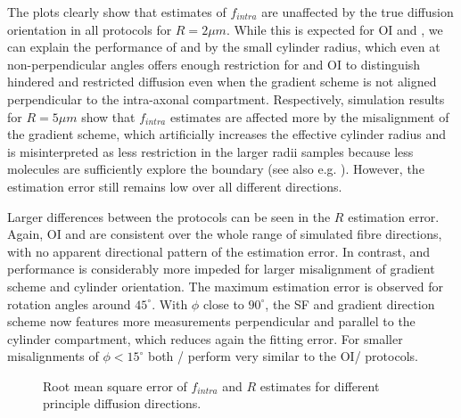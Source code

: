 The plots clearly show that estimates of $f_{intra}$ are unaffected by the true diffusion orientation in all protocols for $R=2\mu m$. While this is expected for {\gls{OI}} and {\SD}, we can explain the performance of {\FD} and {\DO} by the small cylinder radius, which even at non-perpendicular angles offers enough restriction for {\FD} and {\gls{OI}} to distinguish hindered and restricted diffusion even when the gradient scheme is not aligned perpendicular to the intra-axonal compartment. Respectively, simulation results for $R=5\mu m$ show that $f_{intra}$ estimates are affected more by the misalignment of the gradient scheme, which artificially increases the effective cylinder radius and is misinterpreted as less restriction in the larger radii samples because less molecules are sufficiently explore the boundary (see also e.g. \citep{Avram:2004,Zhang:2011}). However, the estimation error still remains low over all different directions.


Larger differences between the protocols can be seen in the $R$ estimation error. Again, {\gls{OI}} and {\SD} are consistent over the whole range of simulated fibre directions, with no apparent directional pattern of the estimation error. In contrast, {\FD} and {\DO} performance is considerably more impeded for larger misalignment of gradient scheme and cylinder orientation. The maximum estimation error is observed for rotation angles around $45^\circ$. With $\phi$ close to $90^\circ$, the {\gls{SF}} and {\DO} gradient direction scheme now features more measurements perpendicular and parallel to the cylinder compartment, which reduces again the fitting error. For smaller misalignments of $\phi<15^\circ$ both {\FD}/{\DO} perform very similar to the {\gls{OI}}/{\SD} protocols.

\begin{figure}[!h]
\centering
    
    
    
  	\caption{Root mean square error of $f_{intra}$ and $R$ estimates for different principle diffusion directions.}
	\label{fig:chapter7 exp1 angular vals 60mT}
\end{figure}


